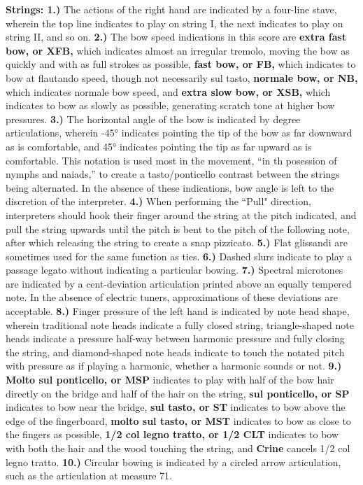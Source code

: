 \documentclass[12pt]{article}
\begin{document}
\begingroup
\textbf{Strings: 1.)} The actions of the right hand are indicated by a four-line stave, wherein the top line indicates to play on string I, the next indicates to play on string II, and so on. \textbf{2.)} The bow speed indications in this score are \textbf{extra fast bow, or XFB,} which indicates almost an irregular tremolo, moving the bow as quickly and with as full strokes as possible,  \textbf{fast bow, or FB,} which indicates to bow at flautando speed, though not necessarily sul tasto, \textbf{normale bow, or NB,}  which indicates normale bow speed, and \textbf{extra slow bow, or XSB,} which indicates to bow as slowly as possible, generating scratch tone at higher bow pressures. \textbf{3.)}  The horizontal angle of the bow is indicated by degree articulations, wherein -45° indicates pointing the tip of the bow as far downward as is comfortable, and 45° indicates pointing the tip as far upward as is comfortable. This notation is used most in the movement, ``in th posession of nymphs and naiads,'' to create a tasto/ponticello contrast between the strings being alternated. In the absence of these indications, bow angle is left to the discretion of the interpreter. \textbf{4.)} When performing the ``Pull" direction, interpreters should hook their finger around the string at the pitch indicated, and pull the string upwards until the pitch is bent to the pitch of the following note, after which releasing the string to create a snap pizzicato. \textbf{5.)} Flat glissandi are sometimes used for the same function as ties. \textbf{6.)} Dashed slurs indicate to play a passage legato without indicating a particular bowing. \textbf{7.)} Spectral microtones are indicated by a cent-deviation articulation printed above an equally tempered note. In the absence of electric tuners, approximations of these deviations are acceptable. \textbf{8.)} Finger pressure of the left hand is indicated by note head shape, wherein traditional note heads indicate a fully closed string, triangle-shaped note heads indicate a pressure half-way between harmonic pressure and fully closing the string, and diamond-shaped note heads indicate to touch the notated pitch with pressure as if playing a harmonic, whether a harmonic sounds or not. \textbf{9.) Molto sul ponticello, or MSP} indicates to play with half of the bow hair directly on the bridge and half of the hair on the string, \textbf{sul ponticello, or SP} indicates to bow near the bridge, \textbf{sul tasto, or ST} indicates to bow above the edge of the fingerboard, \textbf{molto sul tasto, or MST} indicates to bow as close to the fingers as possible, \textbf{1/2 col legno tratto, or 1/2 CLT} indicates to bow with both the hair and the wood touching the string, and \textbf{Crine} cancels 1/2 col legno tratto. \textbf{10.)} Circular bowing is indicated by a circled arrow articulation, such as the articulation at measure 71. \\
\endgroup
\end{document}
